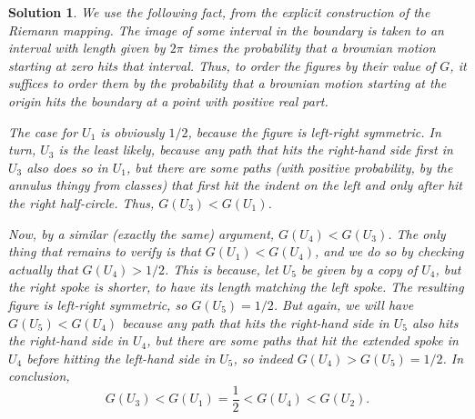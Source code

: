 \documentclass{article}
\theoremstyle{nonumberplain}
\newtheorem{sol}{Solution}
\begin{document}
\begin{sol}
We use the following fact, from the explicit construction of the Riemann mapping. The image of some interval in the boundary is taken to an interval with length given by $2 \pi$ times the probability that a brownian motion starting at zero hits that interval. Thus, to order the figures by their value of $G$, it suffices to order them by the probability that a brownian motion starting at the origin hits the boundary at a point with positive real part.

The case for $U_1$ is obviously $1/2$, because the figure is left-right symmetric. In turn, $U_3$ is the least likely, because any path that hits the right-hand side first in $U_3$ also does so in $U_1$, but there are some paths (with positive probability, by the annulus thingy from classes) that first hit the indent on the left and only after hit the right half-circle. Thus, $G(U_3) < G(U_1)$.

Now, by a similar (exactly the same) argument, $G(U_4) < G(U_3)$. The only thing that remains to verify is that $G(U_1) < G(U_4)$, and we do so by checking actually that $G(U_4) > 1/2$. This is because, let $U_5$ be given by a copy of $U_4$, but the right spoke is shorter, to have its length matching the left spoke. The resulting figure is left-right symmetric, so $G(U_5) = 1/2$. But again, we will have $G(U_5) < G(U_4)$ because any path that hits the right-hand side in $U_5$ also hits the right-hand side in $U_4$, but there are some paths that hit the extended spoke in $U_4$ before hitting the left-hand side in $U_5$, so indeed $G(U_4) > G(U_5) = 1/2$. In conclusion,
\begin{equation}
G(U_3) < G(U_1) = \frac12 < G(U_4) < G(U_2).
\end{equation}
\end{sol}
\end{document}
